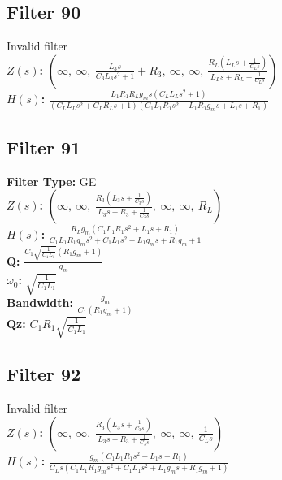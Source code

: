 \documentclass{article}
\begin{document}
\subsection*{Filter 90}
Invalid filter \\ 
\textbf{$Z(s)$:} $\left( \infty, \  \infty, \  \frac{L_{3} s}{C_{3} L_{3} s^{2} + 1} + R_{3}, \  \infty, \  \infty, \  \frac{R_{L} \left(L_{L} s + \frac{1}{C_{L} s}\right)}{L_{L} s + R_{L} + \frac{1}{C_{L} s}}\right)$ \\ 
\textbf{$H(s)$:} $\frac{L_{1} R_{1} R_{L} g_{m} s \left(C_{L} L_{L} s^{2} + 1\right)}{\left(C_{L} L_{L} s^{2} + C_{L} R_{L} s + 1\right) \left(C_{1} L_{1} R_{1} s^{2} + L_{1} R_{1} g_{m} s + L_{1} s + R_{1}\right)}$ \\ 
\subsection*{Filter 91}
\textbf{Filter Type:} GE \\ 
\textbf{$Z(s)$:} $\left( \infty, \  \infty, \  \frac{R_{3} \left(L_{3} s + \frac{1}{C_{3} s}\right)}{L_{3} s + R_{3} + \frac{1}{C_{3} s}}, \  \infty, \  \infty, \  R_{L}\right)$ \\ 
\textbf{$H(s)$:} $\frac{R_{L} g_{m} \left(C_{1} L_{1} R_{1} s^{2} + L_{1} s + R_{1}\right)}{C_{1} L_{1} R_{1} g_{m} s^{2} + C_{1} L_{1} s^{2} + L_{1} g_{m} s + R_{1} g_{m} + 1}$ \\ 
\textbf{Q:} $\frac{C_{1} \sqrt{\frac{1}{C_{1} L_{1}}} \left(R_{1} g_{m} + 1\right)}{g_{m}}$ \\ 
\textbf{$\omega_0$:} $\sqrt{\frac{1}{C_{1} L_{1}}}$ \\ 
\textbf{Bandwidth:} $\frac{g_{m}}{C_{1} \left(R_{1} g_{m} + 1\right)}$ \\ 
\textbf{Qz:} $C_{1} R_{1} \sqrt{\frac{1}{C_{1} L_{1}}}$ \\ 
\subsection*{Filter 92}
Invalid filter \\ 
\textbf{$Z(s)$:} $\left( \infty, \  \infty, \  \frac{R_{3} \left(L_{3} s + \frac{1}{C_{3} s}\right)}{L_{3} s + R_{3} + \frac{1}{C_{3} s}}, \  \infty, \  \infty, \  \frac{1}{C_{L} s}\right)$ \\ 
\textbf{$H(s)$:} $\frac{g_{m} \left(C_{1} L_{1} R_{1} s^{2} + L_{1} s + R_{1}\right)}{C_{L} s \left(C_{1} L_{1} R_{1} g_{m} s^{2} + C_{1} L_{1} s^{2} + L_{1} g_{m} s + R_{1} g_{m} + 1\right)}$ \\ 
\end{document}
